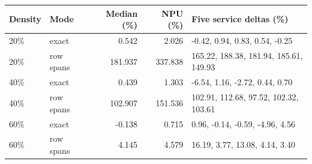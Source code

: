 \begin{tabular}{llrrl}
\toprule
Density & Mode & Median (\%) & NPU (\%) & Five service deltas (\%) \\
\midrule
20\% & exact & 0.542 & 2.026 & -0.42, 0.94, 0.83, 0.54, -0.25 \\
20\% & row spans & 181.937 & 337.838 & 165.22, 188.38, 181.94, 185.61, 149.93 \\
40\% & exact & 0.439 & 1.303 & -6.54, 1.16, -2.72, 0.44, 0.70 \\
40\% & row spans & 102.907 & 151.536 & 102.91, 112.68, 97.52, 102.32, 103.61 \\
60\% & exact & -0.138 & 0.715 & 0.96, -0.14, -0.59, -4.96, 4.56 \\
60\% & row spans & 4.145 & 4.579 & 16.19, 3.77, 13.08, 4.14, 3.40 \\
\bottomrule
\end{tabular}
